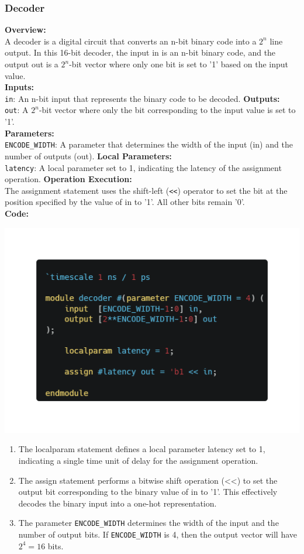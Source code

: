 \documentclass[12pt]{article}
\begin{document}
\subsubsection{Decoder}
\textbf{Overview:}\\
A decoder is a digital circuit that converts an n-bit binary code into a $2^n$ line output. In this 16-bit decoder, the input in is an n-bit binary code,
and the output out is a $2^n$-bit vector where only one bit is set to '1' based on the input value.\\
\textbf{Inputs:}\\
\verb|in|: An n-bit input that represents the binary code to be decoded.
\textbf{Outputs:}\\
\verb|out|: A $2^n$-bit vector where only the bit corresponding to the input value is set to '1'.\\
\textbf{Parameters:}\\
\verb|ENCODE_WIDTH|: A parameter that determines the width of the input (in) and the number of outputs (out).
\textbf{Local Parameters:}\\
\verb|latency|: A local parameter set to 1, indicating the latency of the assignment operation.
\textbf{Operation Execution:}\\
The assignment statement uses the shift-left (\verb|<<|) operator to set the bit at the position specified by the value of in to '1'. All other bits remain '0'.\\
\textbf{Code:}
\begin{center}
    \includegraphics[width=\linewidth]{images/decoder.png}
\end{center}
\begin{enumerate}
    \item The localparam statement defines a local parameter latency set to 1, indicating a single time unit of delay for the assignment operation.
    \item The assign statement performs a bitwise shift operation (<<) to set the output bit corresponding to the binary value of in to '1'.
          This effectively decodes the binary input into a one-hot representation.
    \item The parameter \verb|ENCODE_WIDTH| determines the width of the input and the number of output bits. If \verb|ENCODE_WIDTH| is 4, then the output vector will have $2^4 = 16$ bits.
\end{enumerate}
\end{document}
